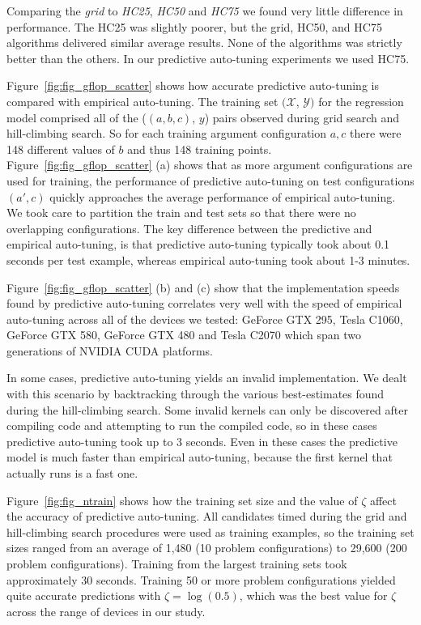 \documentclass{sig-alternate}
\begin{document}
Comparing the {\em grid} to {\em HC25}, {\em HC50} and {\em HC75} we found very
little difference in performance.  The HC25 was slightly poorer, but the grid,
HC50, and HC75 algorithms delivered similar average results. None of the
algorithms was strictly better than the others.  In our predictive
auto-tuning experiments we used HC75.


Figure~\ref{fig:fig_gflop_scatter} shows how accurate predictive auto-tuning is compared with empirical auto-tuning.
The training set $(\mathcal{X}$, $\mathcal{Y})$ for the regression model comprised
all of the ($(a,b,c)$, $y$) pairs observed during grid search and hill-climbing search.
So for each training argument configuration $a,c$ there were 148 different values of $b$ and thus 148 training points.
Figure~\ref{fig:fig_gflop_scatter} (a) shows that as more argument configurations are used for training,
the performance of predictive auto-tuning on test configurations $(a', c)$ quickly
approaches the average performance of empirical auto-tuning.
We took care to partition the train and test sets so that there were no overlapping configurations.
The key difference between the predictive and empirical auto-tuning,
is that predictive auto-tuning
typically took about 0.1 seconds per test example, whereas empirical auto-tuning took about 1-3 minutes.

Figure~\ref{fig:fig_gflop_scatter} (b) and (c) show that the implementation
speeds found by predictive auto-tuning correlates very well with the speed of
empirical auto-tuning across all of the devices we tested: GeForce GTX 295,
Tesla C1060, GeForce GTX 580, GeForce GTX 480 and Tesla C2070 which
span two generations of NVIDIA CUDA platforms.

In some cases, predictive auto-tuning yields an invalid implementation.  We
dealt with this scenario by backtracking through the various best-estimates
found during the hill-climbing search.  Some invalid kernels can only be
discovered after compiling code and attempting to run the compiled code, so in
these cases predictive auto-tuning took up to 3 seconds.  Even in these cases
the predictive model is much faster than empirical auto-tuning, because the
first kernel that actually runs is a fast one.

Figure~\ref{fig:fig_ntrain} shows how the training set size
and the value of $\zeta$ affect the accuracy of predictive auto-tuning.
All candidates timed during the grid and
hill-climbing search procedures were used as training examples, so the training
set sizes ranged from an average of 1,480 (10 problem configurations) to 29,600
(200 problem configurations).
Training from the largest training sets took approximately 30 seconds.
Training 50 or more problem configurations yielded quite accurate predictions
with $\zeta=\log(0.5)$, which was the best value for $\zeta$ across the range of
devices in our study.
\end{document}

